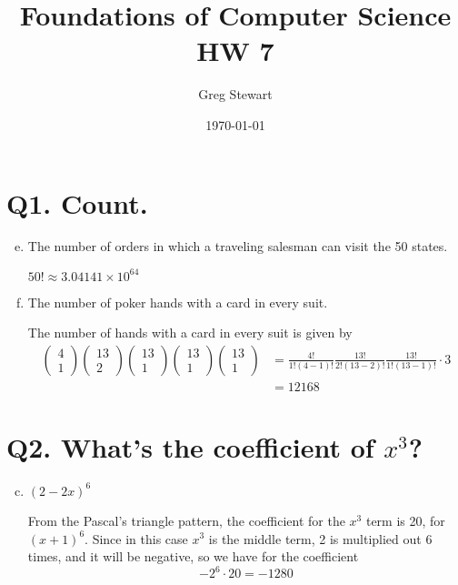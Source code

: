 \documentclass{article}
\title{Foundations of Computer Science HW 7}
\author{Greg Stewart}
\date{\today}
\begin{document}
\maketitle

\section*{Q1. \normalsize Count.}

\begin{enumerate}[(a)]\setcounter{enumi}{4}
  \item The number of orders in which a traveling salesman can visit the 50 states.
    
    $50! \approx 3.04141 \times 10^{64}$
  \item The number of poker hands with a card in every suit.
    
    The number of hands with a card in every suit is given by
    \begin{align*}
      \begin{pmatrix}
        4 \\ 1 
      \end{pmatrix}
      \begin{pmatrix}
        13 \\ 2 
      \end{pmatrix}
      \begin{pmatrix}
        13 \\ 1 
      \end{pmatrix}
      \begin{pmatrix}
        13 \\ 1 
      \end{pmatrix}
      \begin{pmatrix}
        13 \\ 1 
      \end{pmatrix}
      &= \frac{4!}{1!(4-1)!}\frac{13!}{2!(13-2)!}\frac{13!}{1!(13-1)!}\cdot3 \\
      &= 12168
    \end{align*}
    
\end{enumerate}



\section*{Q2. \normalsize What's the coefficient of $x^3$?}

\begin{enumerate}[(a)]\setcounter{enumi}{2}
  \item $(2 - 2x)^6$

    From the Pascal's triangle pattern, the coefficient for the $x^3$ term is 20, for $(x+1)^6$. Since in this case $x^3$ is the middle term, 2 is multiplied out 6 times, and it will be negative, so we have for the coefficient $$-2^6\cdot20 = -1280$$


\end{enumerate}
\end{document}
